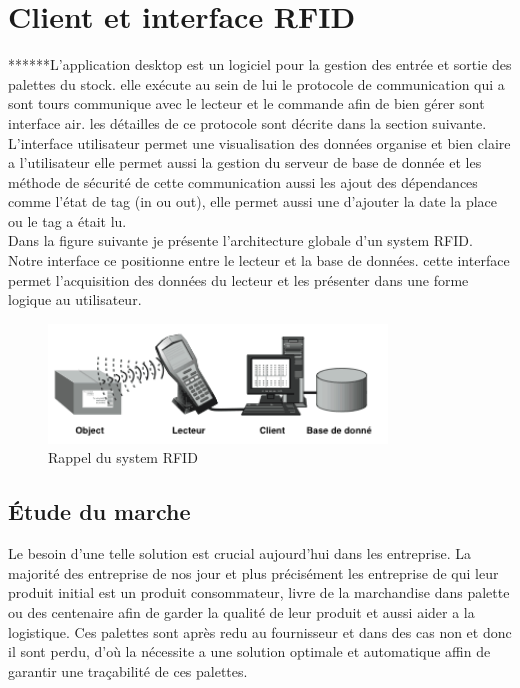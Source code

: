 \documentclass[11pt, a4paper, twoside]{book}
\begin{document}
\section{Client et interface RFID}

******L'application desktop  est un logiciel pour la gestion des entrée et sortie des palettes du stock. elle exécute au sein de lui le protocole de communication  qui a sont tours communique avec le lecteur et le commande  afin de bien gérer sont interface air. les détailles de ce protocole sont décrite dans la section suivante. L'interface utilisateur  permet  une visualisation des données organise et bien claire a l'utilisateur elle permet aussi  la gestion du serveur de base de donnée et les méthode de sécurité de cette communication aussi les ajout des dépendances comme l'état de tag (in ou out), elle permet aussi une d'ajouter la date la place ou le tag a était lu.\\

Dans la figure suivante je présente l'architecture globale d'un system RFID. Notre interface ce positionne entre le lecteur et la base de données. cette interface permet l'acquisition des données du lecteur et les présenter dans une forme logique au utilisateur.

\begin{figure}[H]
\centering
\includegraphics[width=9cm]{systemx}
\caption{Rappel du system RFID}
\end{figure}

\subsection{Étude du marche}
Le besoin d'une telle solution est crucial aujourd'hui dans les entreprise. La majorité des entreprise de nos jour et plus précisément les entreprise de qui leur produit initial est un produit consommateur, livre de la marchandise dans palette ou des centenaire afin de garder la qualité de leur produit et aussi aider a la logistique. Ces palettes sont après redu au fournisseur et dans des cas non et donc il sont perdu, d'où la nécessite a une solution optimale et automatique affin de garantir une traçabilité de ces palettes.
\end{document}
